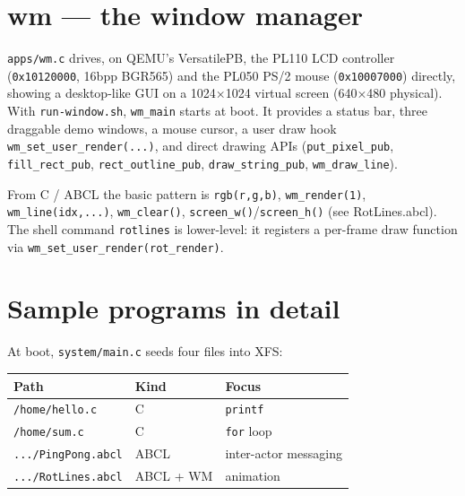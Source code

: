 \documentclass[a4paper,11pt]{article}
\begin{document}
\section{wm --- the window manager}
\verb|apps/wm.c| drives, on QEMU's VersatilePB, the PL110 LCD controller
(\verb|0x10120000|, 16bpp BGR565) and the PL050 PS/2 mouse (\verb|0x10007000|)
directly, showing a desktop-like GUI on a 1024×1024 virtual screen (640×480
physical). With \verb|run-window.sh|, \verb|wm_main| starts at boot. It provides
a status bar, three draggable demo windows, a mouse cursor, a user draw hook
\verb|wm_set_user_render(...)|, and direct drawing APIs (\verb|put_pixel_pub|,
\verb|fill_rect_pub|, \verb|rect_outline_pub|, \verb|draw_string_pub|,
\verb|wm_draw_line|).

From C / ABCL the basic pattern is \verb|rgb(r,g,b)|, \verb|wm_render(1)|,
\verb|wm_line(idx,...)|, \verb|wm_clear()|, \verb|screen_w()|/\verb|screen_h()|
(see RotLines.abcl). The shell command \verb|rotlines| is lower-level: it
registers a per-frame draw function via \verb|wm_set_user_render(rot_render)|.

\section{Sample programs in detail}
At boot, \verb|system/main.c| seeds four files into XFS:
\begin{center}\footnotesize
\begin{tabular}{@{}l l l@{}}
\toprule \textbf{Path} & \textbf{Kind} & \textbf{Focus}\\ \midrule
\verb|/home/hello.c| & C & \verb|printf|\\
\verb|/home/sum.c|   & C & \verb|for| loop\\
\verb|.../PingPong.abcl| & ABCL & inter-actor messaging\\
\verb|.../RotLines.abcl| & ABCL + WM & animation\\
\bottomrule
\end{tabular}
\end{center}
\end{document}
